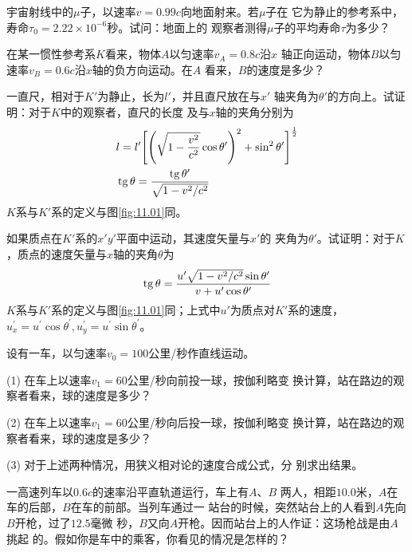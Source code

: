 \begin{exercises}

\exercise 宇宙射线中的$ \mu $子，以速率$ v = 0 . 9 9 c $向地面射来。若$ \mu $子在
它为静止的参考系中，寿命$ \tau _ { 0 } = 2 . 2 2 \times 1 0 ^ { - 6 } $秒。试问：地面上的
观察者测得$ \mu $子的平均寿命$ \tau $为多少？

\exercise 在某一惯性参考系$ K $看来，物体$ A $以匀速率$ v _ { A } = 0 . 8 c $沿$ x $
轴正向运动，物体$ B $以匀速率$ v _ { B } = 0 . 6 c $沿$ x $轴的负方向运动。在$ A $
看来，$ B $的速度是多少？

\exercise 一直尺，相对于$ K' $为静止，长为$ l' $，并且直尺放在与$ x' $
轴夹角为$ \theta ' $的方向上。试证明：对于$ K $中的观察者，直尺的长度
及与$ x $轴的夹角分别为
\begin{align*}
   & l=l^{\prime}\Bigg[\Bigg(\sqrt{1-\frac{v^{2}}{c^{2}}} \cos \theta^{\prime}\Bigg)^{2}+\sin ^{2} \theta^{\prime}\Bigg]^{\frac{1}{2}} \\
   & \operatorname{tg} \theta=\frac{\operatorname{tg} \theta^{\prime}}{\sqrt{1-v^{2} / c^{2}}}
\end{align*}
$ K $系与$ K' $系的定义与图\ref{fig:11.01}同。

\exercise 如果质点在$ K' $系的$ x'y' $平面中运动，其速度矢量与$ x' $的
夹角为$ \theta ' $。试证明：对于$ K $，质点的速度矢量与$ x $轴的夹角$ \theta $为
\begin{equation*}
  \operatorname{tg} \theta=\frac{u^{\prime} \sqrt{1-v^{2} / c^{2}} \sin \theta^{\prime}}{v+u^{\prime} \cos \theta^{\prime}}
\end{equation*}
$ K $系与$ K' $系的定义与图\ref{fig:11.01}同；上式中$ u' $为质点对$ K' $系的速度，
$ u _ x ^ { \prime } = u ^ { \prime } \cos \theta ^ { \prime } , u _ y ^ { \prime } = u ^ { \prime } \sin \theta ^ { \prime } $。

\exercise 设有一车，以匀速率$ v _ { 0 } = 1 0 0 $公里/秒作直线运动。

(1) 在车上以速率$ v _ { 1 } = 6 0 $公里/秒向前投一球，按伽利略变
换计算，站在路边的观察者看来，球的速度是多少？

(2) 在车上以速率$ v _ { 1 } = 6 0 $公里/秒向后投一球，按伽利略变
换计算，站在路边的观察者看来，球的速度是多少？

(3) 对于上述两种情况，用狭义相对论的速度合成公式，分
别求出结果。

\exercise 一高速列车以$ 0.6c $的速率沿平直轨道运行，车上有$ A $、$ B $
两人，相距$ 10.0 $米，$ A $在车的后部，$ B $在车的前部。当列车通过一
站台的时候，突然站台上的人看到$ A $先向$ B $开枪，过了$ 12.5 $毫微
秒，$ B $又向$ A $开枪。因而站台上的人作证：这场枪战是由$ A $挑起
的。假如你是车中的乘客，你看见的情况是怎样的？


\end{exercises}
